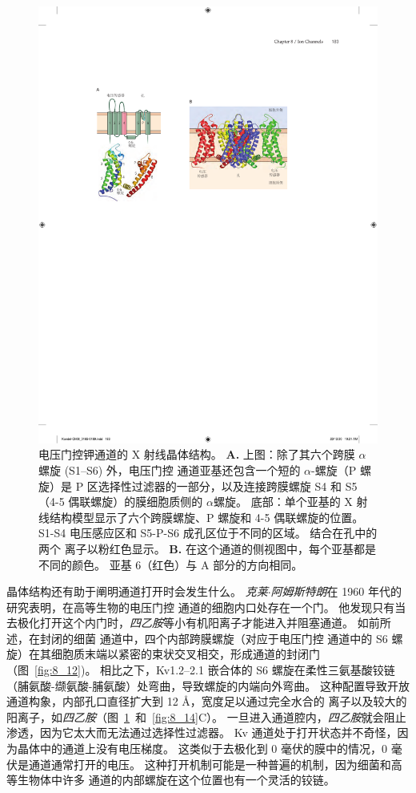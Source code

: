 \begin{figure}[htbp]
	\centering
	\includegraphics[width=0.5\linewidth]{chap08/fig_8_13}
	\caption{电压门控钾通道的 X 射线晶体结构\cite{long2007atomic}。
		\textbf{A.} 上图：除了其六个跨膜 $\alpha$ 螺旋 (S1–S6) 外，电压门控  通道亚基还包含一个短的 $\alpha$-螺旋（P 螺旋）是 P 区选择性过滤器的一部分，以及连接跨膜螺旋 S4 和 S5（4-5 偶联螺旋）的膜细胞质侧的 $\alpha$螺旋。
		底部：单个亚基的 X 射线结构模型显示了六个跨膜螺旋、P 螺旋和 4-5 偶联螺旋的位置。
		S1-S4 电压感应区和 S5-P-S6 成孔区位于不同的区域。
		结合在孔中的两个  离子以粉红色显示。
		\textbf{B.} 在这个通道的侧视图中，每个亚基都是不同的颜色。
		亚基 6（红色）与 A 部分的方向相同。}
	\label{fig:8_13}
\end{figure}


晶体结构还有助于阐明通道打开时会发生什么。
\textit{克莱$\cdot$阿姆斯特朗}在 1960 年代的研究表明，在高等生物的电压门控  通道的细胞内口处存在一个门。
他发现只有当去极化打开这个内门时，\textit{四乙胺}等小有机阳离子才能进入并阻塞通道。
如前所述，在封闭的细菌  通道中，四个内部跨膜螺旋（对应于电压门控  通道中的 S6 螺旋）在其细胞质末端以紧密的束状交叉相交，形成通道的封闭门（图~\ref{fig:8_12})。
相比之下，Kv1.2–2.1 嵌合体的 S6 螺旋在柔性三氨基酸铰链（脯氨酸-缬氨酸-脯氨酸）处弯曲，导致螺旋的内端向外弯曲。
这种配置导致开放通道构象，内部孔口直径扩大到 12 Å，宽度足以通过完全水合的  离子以及较大的阳离子，如\textit{四乙胺}（图~\ref{fig:8_13}~和~\ref{fig:8_14}C）。
一旦进入通道腔内，\textit{四乙胺}就会阻止  渗透，因为它太大而无法通过选择性过滤器。
Kv 通道处于打开状态并不奇怪，因为晶体中的通道上没有电压梯度。
这类似于去极化到 0 毫伏的膜中的情况，0 毫伏是通道通常打开的电压。
这种打开机制可能是一种普遍的机制，因为细菌和高等生物体中许多  通道的内部螺旋在这个位置也有一个灵活的铰链。


